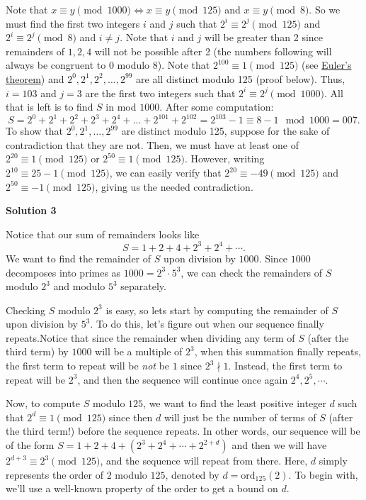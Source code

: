 \begin{enumerate}
Note that $x \equiv y \pmod{1000} \Leftrightarrow x \equiv y \pmod{125}$ and $x \equiv y \pmod{8}$. So we must find the first two integers $i$ and $j$ such that $2^i \equiv 2^j \pmod{125}$ and $2^i \equiv 2^j \pmod{8}$ and $i \neq j$. Note that $i$ and $j$ will be greater than 2 since remainders of $1, 2, 4$ will not be possible after 2 (the numbers following will always be congruent to 0 modulo 8). Note that $2^{100}\equiv 1\pmod{125}$ (see \href{https://artofproblemsolving.com/wiki/index.php?title=Euler\%27s\_Totient\_Theorem}{Euler's theorem}) and $2^0,2^1,2^2,\ldots,2^{99}$ are all distinct modulo 125 (proof below). Thus, $i = 103$ and $j =3$ are the first two integers such that $2^i \equiv 2^j \pmod{1000}$. All that is left is to find $S$ in mod $1000$. After some computation:
 \[S = 2^0+2^1+2^2+2^3+2^4+...+2^{101}+ 2^{102} = 2^{103}-1 \equiv 8 - 1 \mod 1000 = \boxed{007}.\]To show that $2^0, 2^1,\ldots, 2^{99}$ are distinct modulo 125, suppose for the sake of contradiction that they are not. Then, we must have at least one of $2^{20}\equiv 1\pmod{125}$ or $2^{50}\equiv 1\pmod{125}$. However, writing $2^{10}\equiv 25 - 1\pmod{125}$, we can easily verify that $2^{20}\equiv -49\pmod{125}$ and $2^{50}\equiv -1\pmod{125}$, giving us the needed contradiction.

 



\textbf{Solution 3}

Notice that our sum of remainders looks like 
 \[S = 1 + 2 + 4 + 2^3 + 2^4 + \cdots.\] We want to find the remainder of $S$ upon division by $1000.$ Since $1000$ decomposes into primes as $1000 = 2^3 \cdot 5^3$, we can check the remainders of $S$ modulo $2^3$ and modulo $5^3$ separately. 

 Checking $S$ modulo $2^3$ is easy, so lets start by computing the remainder of $S$ upon division by $5^3.$ To do this, let's figure out when our sequence finally repeats.Notice that since the remainder when dividing any term of $S$ (after the third term) by $1000$ will be a multiple of $2^3$, when this summation finally repeats, the first term to repeat will be \textit{not} be $1$ since $2^3 \nmid 1.$ Instead, the first term to repeat will be $2^3$, and then the sequence will continue once again $2^4, 2^5, \cdots.$ 

 Now, to compute $S$ modulo $125$, we want to find the least positive integer $d$ such that $2^d \equiv 1 \pmod {125}$ since then $d$ will just be the number of terms of $S$ (after the third term!) before the sequence repeats. In other words, our sequence will be of the form $S = 1 + 2 + 4 + \left(2^3 + 2^4 + \cdots + 2^{2 + d}\right)$ and then we will have $2^{d + 3} \equiv 2^3 \pmod {125}$, and the sequence will repeat from there. Here, $d$ simply represents the order of $2$ modulo $125$, denoted by $d = \text{ord}_{125}(2).$ To begin with, we'll use a well-known property of the order to get a bound on $d.$


\end{enumerate}
